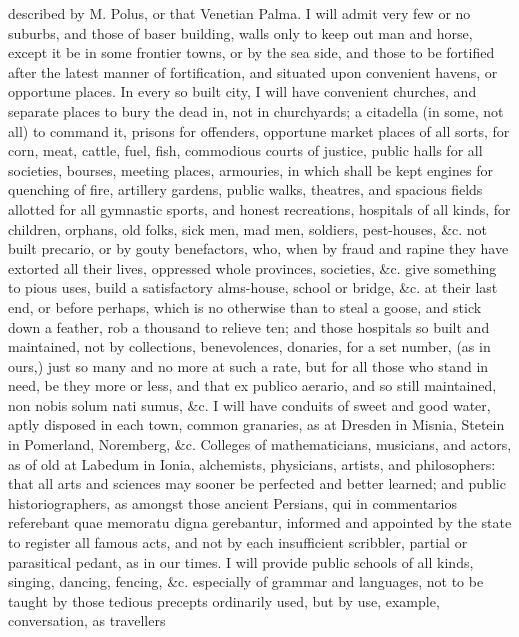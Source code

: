 {described by M. Polus, or that Venetian Palma. I will admit very few or
no suburbs, and those of baser building, walls only to keep out man and
horse, except it be in some frontier towns, or by the sea side, and
those to be fortified  after the latest manner of fortification,
and situated upon convenient havens, or opportune places. In every so
built city, I will have convenient churches, and separate places to
bury the dead in, not in churchyards; a citadella (in some, not all) to
command it, prisons for offenders, opportune market places of all
sorts, for corn, meat, cattle, fuel, fish, commodious courts of
justice, public halls for all societies, bourses, meeting places,
armouries, in which shall be kept engines for quenching of fire,
artillery gardens, public walks, theatres, and spacious fields allotted
for all gymnastic sports, and honest recreations, hospitals of all
kinds, for children, orphans, old folks, sick men, mad men, soldiers,
pest-houses, \&c. not built precario, or by gouty benefactors, who, when
by fraud and rapine they have extorted all their lives, oppressed whole
provinces, societies, \&c. give something to pious uses, build a
satisfactory alms-house, school or bridge, \&c. at their last end, or
before perhaps, which is no otherwise than to steal a goose, and stick
down a feather, rob a thousand to relieve ten; and those hospitals so
built and maintained, not by collections, benevolences, donaries, for a
set number, (as in ours,) just so many and no more at such a rate, but
for all those who stand in need, be they more or less, and that ex
publico aerario, and so still maintained, non nobis solum nati sumus,
\&c. I will have conduits of sweet and good water, aptly disposed in
each town, common  granaries, as at Dresden in Misnia, Stetein in
Pomerland, Noremberg, \&c. Colleges of mathematicians, musicians, and
actors, as of old at Labedum in Ionia, alchemists, physicians,
artists, and philosophers: that all arts and sciences may sooner be
perfected and better learned; and public historiographers, as amongst
those ancient Persians, qui in commentarios referebant quae
memoratu digna gerebantur, informed and appointed by the state to
register all famous acts, and not by each insufficient scribbler,
partial or parasitical pedant, as in our times. I will provide public
schools of all kinds, singing, dancing, fencing, \&c. especially of
grammar and languages, not to be taught by those tedious precepts
ordinarily used, but by use, example, conversation, as travellers
}
